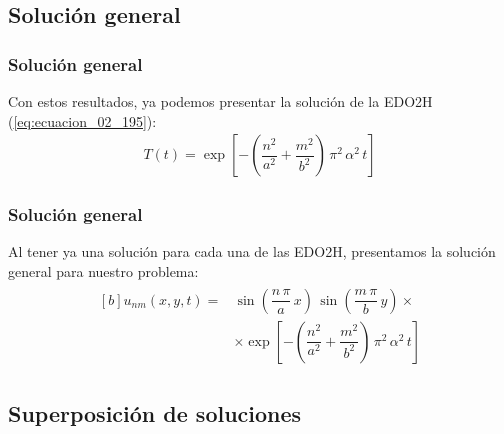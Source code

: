 \documentclass[12pt]{beamer}
\begin{document}
\subsection{Solución general}

\begin{frame}
\frametitle{Solución general}
Con estos resultados, ya podemos presentar la solución de la EDO2H (\ref{eq:ecuacion_02_195}):
\begin{align}
T(t) = \exp\left[ - \left( \dfrac{n^{2}}{a^{2}} + \dfrac{m^{2}}{b^{2}} \right) \, \pi^{2} \, \alpha^{2} \, t \right]
\label{eq:ecuacion_02_205}
\end{align}
\end{frame}
\begin{frame}
\frametitle{Solución general}
Al tener ya una solución para cada una de las EDO2H, presentamos la solución general para nuestro problema:
\begin{align}
\begin{aligned}[b]
u_{nm}(x, y, t) =& \sin \left( \dfrac{n \, \pi}{a} \, x \right) \, \sin \left( \dfrac{m \, \pi}{b} \, y \right) \times \\[1em]
&\times \exp\left[ - \left( \dfrac{n^{2}}{a^{2}} + \dfrac{m^{2}}{b^{2}} \right) \, \pi^{2} \, \alpha^{2} \, t \right]
\label{eq:ecuacion_02_206}
\end{aligned}
\end{align}
\end{frame}

\subsection{Superposición de soluciones}
\end{document}
